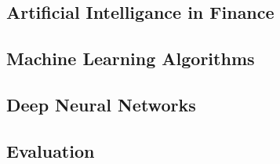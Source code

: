 \subsection{Artificial Intelligance in Finance}


\subsection{Machine Learning Algorithms}


\subsection{Deep Neural Networks}


\subsection{Evaluation}
